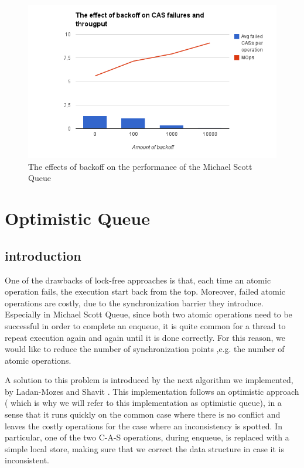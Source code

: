\begin{figure}
 \centering
  \includegraphics[scale=0.7]{queue_msqueue_backoff.png}
 \caption{ The effects of backoff on the performance of the Michael Scott Queue}
\label{queue_msqueue_backoff}
\end{figure}


\section{Optimistic Queue}

\subsection{introduction}
One of the drawbacks of lock-free approaches is that, each time an atomic operation fails, the execution start back from the top. Moreover, failed atomic operations are costly, due to the synchronization barrier they introduce. Especially in Michael Scott Queue, since both two atomic operations need to be successful in order to complete an enqueue, it is quite common for a thread to repeat execution again and again until it is done correctly. For this reason, we would like to reduce the number of synchronization points ,e.g. the number of atomic operations.

A solution to this problem is introduced by the next algorithm we implemented, by Ladan-Mozes and Shavit \cite{optimistic}. This implementation follows an optimistic approach ( which is why we will refer to this implementation as optimistic queue), in a sense that it runs quickly on the common case where there is no conflict and leaves the costly operations for the case where an inconsistency is spotted. In particular, one of the two C-A-S operations, during enqueue, is replaced with a simple local store, making sure that we correct the data structure in case it is inconsistent.

